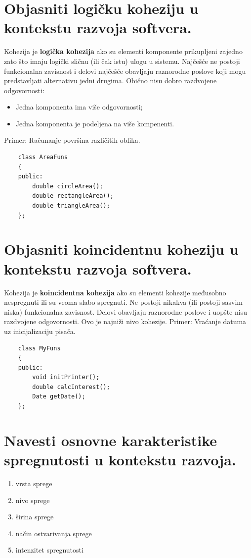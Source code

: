 \documentclass[a4paper]{article}
\begin{document}
\section{Objasniti logičku koheziju u kontekstu razvoja softvera.}
  Kohezija je \textbf{logička kohezija} ako su elementi komponente prikupljeni zajedno zato što
  imaju logički sličnu (ili čak istu) ulogu u sistemu. Najčešće ne postoji funkcionalna
  zavisnost i delovi najčešće obavljaju raznorodne poslove koji mogu predstavljati alternativu
  jedni drugima. Obično nisu dobro razdvojene odgovornosti: 
  \begin{itemize}
    \item Jedna komponenta ima više odgovornosti;
    \item Jedna komponenta je podeljena na više kompenenti.
  \end{itemize}
  Primer: Računanje površina različitih oblika.

  \begin{lstlisting}
    class AreaFuns
    {
    public:
        double circleArea();
        double rectangleArea();
        double triangleArea();
    };\end{lstlisting}

\section{Objasniti koincidentnu koheziju u kontekstu razvoja softvera.}
  Kohezija je \textbf{koincidentna kohezija} ako su elementi kohezije međusobno nespregnuti 
  ili su veoma slabo spregnuti. 
  Ne postoji nikakva (ili postoji sasvim niska) funkcionalna zavisnost. Delovi obavljaju raznorodne
  poslove i uopšte nisu razdvojene odgovornosti. Ovo je najniži nivo kohezije.
  Primer: Vraćanje datuma uz inicijalizaciju pisača.
  
  \begin{lstlisting}
    class MyFuns
    {
    public:
        void initPrinter();
        double calcInterest();
        Date getDate();
    };\end{lstlisting}

\section{Navesti osnovne karakteristike spregnutosti u kontekstu razvoja.}
  \begin{enumerate}
    \item vrsta sprege
    \item nivo sprege
    \item širina sprege
    \item način ostvarivanja sprege
    \item intenzitet spregnutosti
  \end{enumerate}
\end{document}
